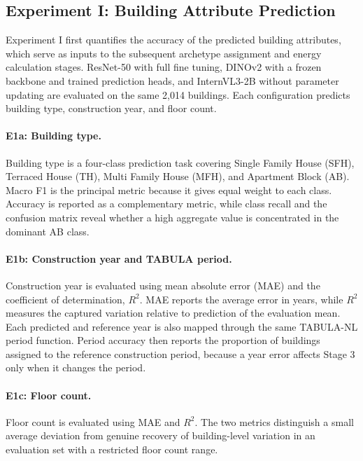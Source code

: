 \subsection{Experiment I: Building Attribute Prediction}
\label{sec:prediction_tasks_metrics}

Experiment I first quantifies the accuracy of the predicted building attributes, which serve as inputs to the subsequent archetype assignment and energy calculation stages. ResNet-50 with full fine tuning, DINOv2 with a frozen backbone and trained prediction heads, and InternVL3-2B without parameter updating are evaluated on the same 2,014 buildings. Each configuration predicts building type, construction year, and floor count. 

\paragraph{E1a: Building type.}
Building type is a four-class prediction task covering Single Family House (SFH), Terraced House (TH), Multi Family House (MFH), and Apartment Block (AB). Macro F1 is the principal metric because it gives equal weight to each class. Accuracy is reported as a complementary metric, while class recall and the confusion matrix reveal whether a high aggregate value is concentrated in the dominant AB class.

\paragraph{E1b: Construction year and \acs{TABULA} period.}
Construction year is evaluated using mean absolute error (MAE) and the coefficient of determination, $R^2$. MAE reports the average error in years, while $R^2$ measures the captured variation relative to prediction of the evaluation mean. Each predicted and reference year is also mapped through the same TABULA-NL period function. Period accuracy then reports the proportion of buildings assigned to the reference construction period, because a year error affects Stage 3 only when it changes the period.

\paragraph{E1c: Floor count.}
Floor count is evaluated using MAE and $R^2$. The two metrics distinguish a small average deviation from genuine recovery of building-level variation in an evaluation set with a restricted floor count range.

